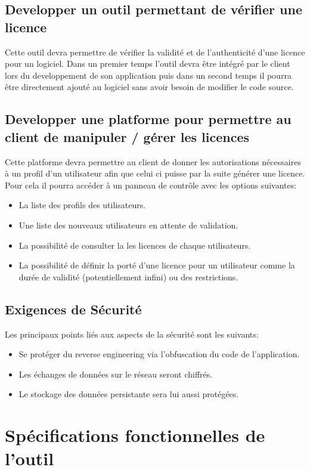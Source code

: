 \section{Developper un outil permettant de vérifier une licence}
Cette outil devra permettre de vérifier la validité et de l'authenticité d'une licence pour un logiciel. \newline
Dans un premier temps l'outil devra être intégré par le client lors du developpement de son application 
puis dans un second temps il pourra être directement ajouté au logiciel sans avoir besoin de modifier le 
code source.

\section{Developper une platforme pour permettre au client de manipuler / gérer les licences}
Cette platforme devra permettre au client de donner les autorisations nécessaires à un profil d'un utilisateur afin que celui ci puisse par la suite générer une licence. Pour cela il pourra accéder à un panneau de contrôle avec les options suivantes:
\begin{itemize}
	\item La liste des profils des utilisateurs.
	\item Une liste des nouveaux utilisateurs en attente de validation.
	\item La possibilité de consulter la les licences de chaque utilisateurs.
	\item La possibilité de définir la porté d'une licence pour un utilisateur 
				comme la durée de validité (potentiellement infini) ou des restrictions.
\end{itemize}   

\section{Exigences de Sécurité}
Les principaux points liés aux aspects de la sécurité sont les suivants:
\begin{itemize}
	\item Se protéger du reverse engineering via l'obfuscation du code de l'application.
	\item Les échanges de données sur le réseau seront chiffrés.
	\item Le stockage des données persistante sera lui aussi protégées.
\end{itemize}   

\chapter{Spécifications fonctionnelles de l'outil}

